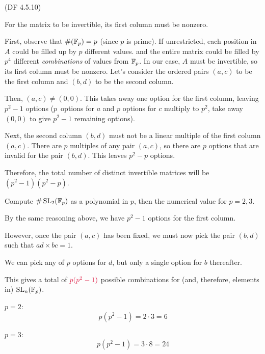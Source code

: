 \begin{problem}{(\textsf{DF 4.5.10})}
\begin{enumalph}
\begin{Answer}
        \noindent
        For the matrix to be invertible, its first column must be nonzero.
        
        First, observe that $\#(\mathbb{F}_p) = p$ (since $p$ is prime).
        If unrestricted, each position in $A$ could be filled up by $p$ different values.
        and the entire matrix could be filled by $p^4$ different \textit{combinations} of values
        from $\mathbb{F}_p$.
        In our case, $A$ must be invertible, so its first column must be nonzero.
        Let's consider the ordered pairs $(a,c)$ to be the first column
        and $(b,d)$ to be the second column.
        
        Then, $(a, c) \neq (0,0)$. This takes away one option for the first column,
        leaving $p^2 - 1$ options ($p$~options for $a$ and $p$ options for $c$
        multiply to $p^2$, take away $(0,0)$ to give $p^2 - 1$ remaining options).
        
        Next, the second column $(b,d)$ must not be a linear multiple of the first column $(a,c)$.
        There are $p$ multiples of any pair $(a,c)$, so there are $p$ options that are invalid
        for the pair $(b,d)$. This leaves $p^2 - p$ options.

        Therefore, the total number of distinct invertible matrices will be
        $(p^2 - 1)(p^2 - p)$.
      \end{Answer}
    \item Compute $\#\operatorname{SL}_2(\mathbb{F}_p)$ as a polynomial in $p$,
      then the numerical value for $p=2,3$.

      \begin{Answer}
        By the same reasoning above, we have $p^2 - 1$ options for the first column.

        However, once the pair $(a, c)$ has been fixed, we must now pick
        the pair $(b, d)$ such that $ad \times bc = 1$.

        \noindent
        We can pick any of $p$ options for $d$, but only a single option for $b$ thereafter.

        This gives a total of $\crim{p(p^2 - 1)}$ possible combinations for (and, therefore,
        elements in)  $\operatorname{SL}_n(\mathbb{F}_p)$.

        \begin{enumalph}
          \item $p = 2$:
            \[ p(p^2 - 1) = 2 \cdot 3 = 6\]
          \item $p = 3$:
            \[ p(p^2 - 1) = 3 \cdot 8 = 24\]
        \end{enumalph}
      \end{Answer}


\end{enumalph}
\end{problem}
